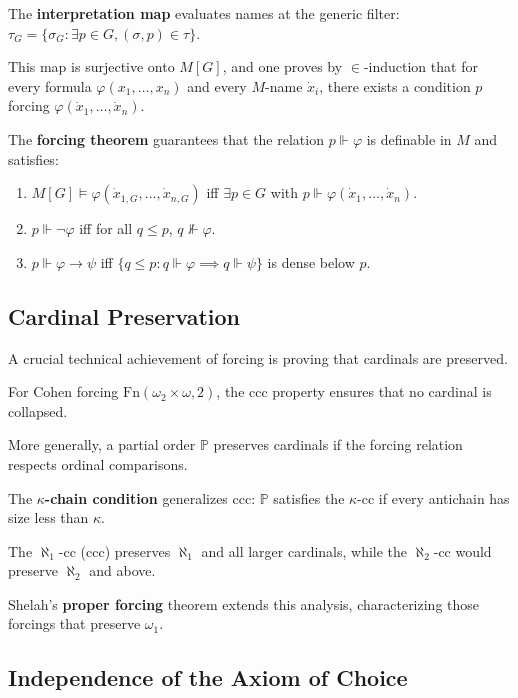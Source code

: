 The \textbf{interpretation map} evaluates names at the generic filter: $\tau_G = \{\sigma_G : \exists p \in G, (\sigma, p) \in \tau\}$.

This map is surjective onto $M[G]$, and one proves by $\in$-induction that for every formula $\varphi(x_1, \ldots, x_n)$ and every $M$-name $\dot{x}_i$, there exists a condition $p$ forcing $\varphi(\dot{x}_1, \ldots, \dot{x}_n)$.

The \textbf{forcing theorem} guarantees that the relation $p \Vdash \varphi$ is definable in $M$ and satisfies:
\begin{enumerate}
\item $M[G] \models \varphi(\dot{x}_{1,G}, \ldots, \dot{x}_{n,G})$ iff $\exists p \in G$ with $p \Vdash \varphi(\dot{x}_1, \ldots, \dot{x}_n)$.
\item $p \Vdash \neg\varphi$ iff for all $q \leq p$, $q \not\Vdash \varphi$.
\item $p \Vdash \varphi \to \psi$ iff $\{q \leq p : q \Vdash \varphi \implies q \Vdash \psi\}$ is dense below $p$.
\end{enumerate}

\subsection*{Cardinal Preservation}

A crucial technical achievement of forcing is proving that cardinals are preserved.

For Cohen forcing $\text{Fn}(\omega_2 \times \omega, 2)$, the ccc property ensures that no cardinal is collapsed.

More generally, a partial order $\mathbb{P}$ preserves cardinals if the forcing relation respects ordinal comparisons.

The \textbf{$\kappa$-chain condition} generalizes ccc: $\mathbb{P}$ satisfies the $\kappa$-cc if every antichain has size less than $\kappa$.

The $\aleph_1$-cc (ccc) preserves $\aleph_1$ and all larger cardinals, while the $\aleph_2$-cc would preserve $\aleph_2$ and above.

Shelah's \textbf{proper forcing} theorem extends this analysis, characterizing those forcings that preserve $\omega_1$.

\subsection*{Independence of the Axiom of Choice}

